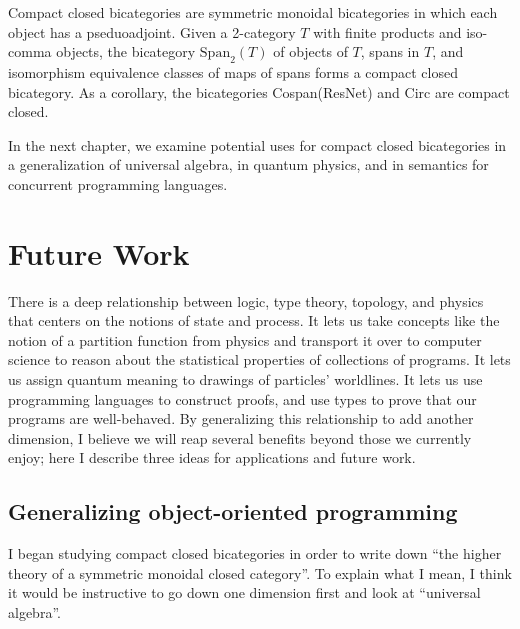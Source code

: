 \documentclass[12pt,twoside,openright]{report}
\newcommand{\Span}{\mbox{Span}}
\begin{document}
Compact closed bicategories are symmetric monoidal bicategories in which each object has a pseduoadjoint.  Given a 2-category $T$ with finite products and iso-comma objects, the bicategory $\Span_2(T)$ of objects of $T$, spans in $T$, and isomorphism equivalence classes of maps of spans forms a compact closed bicategory.  As a corollary, the bicategories Cospan(ResNet) and Circ are compact closed.

In the next chapter, we examine potential uses for compact closed bicategories in a generalization of universal algebra, in quantum physics, and in semantics for concurrent programming languages.

\chapter{Future Work}

There is a deep relationship between logic, type theory, topology, and physics that centers on the notions of state and process.  It lets us take concepts like the notion of a partition function from physics and transport it over to computer science to reason about the statistical properties of collections of programs.  It lets us assign quantum meaning to drawings of particles' worldlines.  It lets us use programming languages to construct proofs, and use types to prove that our programs are well-behaved.  By generalizing this relationship to add another dimension, I believe we will reap several benefits beyond those we currently enjoy; here I describe three ideas for applications and future work.

\section{Generalizing object-oriented programming}
I began studying compact closed bicategories in order to write down ``the higher theory of a symmetric monoidal closed category''.  To explain what I mean, I think it would be instructive to go down one dimension first and look at ``universal algebra''.
\end{document}
